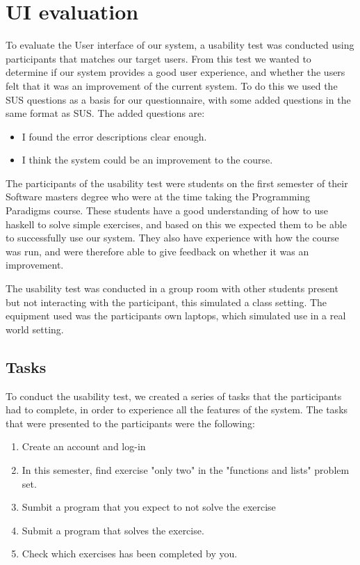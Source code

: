 \section{UI evaluation} \label{UIEval}
To evaluate the User interface of our system, a usability test was conducted using participants that matches our target users. From this test we wanted to determine if our system provides a good user experience, and whether the users felt that it was an improvement of the current system.
To do this we used the SUS questions as a basis for our questionnaire, with some added questions in the same format as SUS. The added questions are:
\begin{itemize}
    \item I found the error descriptions clear enough.
    \item I think the system could be an improvement to the course.
\end{itemize}
The participants of the usability test were students on the first semester of their Software masters degree who were at the time taking the Programming Paradigms course. 
These students have a good understanding of how to use haskell to solve simple exercises, and based on this we expected them to be able to successfully use our system. They also have experience with how the course was run, and were therefore able to give feedback on whether it was an improvement.

The usability test was conducted in a group room with other students present but not interacting with the participant, this simulated a class setting. 
The equipment used was the participants own laptops, which simulated use in a real world setting.

\subsection*{Tasks}
To conduct the usability test, we created a series of tasks that the participants had to complete, in order to experience all the features of the system.
The tasks that were presented to the participants were the following:
\begin{enumerate}
    \item Create an account and log-in
    \item In this semester, find exercise "only two" in the "functions and lists" problem set.
    \item Sumbit a program that you expect to not solve the exercise
    \item Submit a program that solves the exercise.
    \item Check which exercises has been completed by you.
\end{enumerate}

